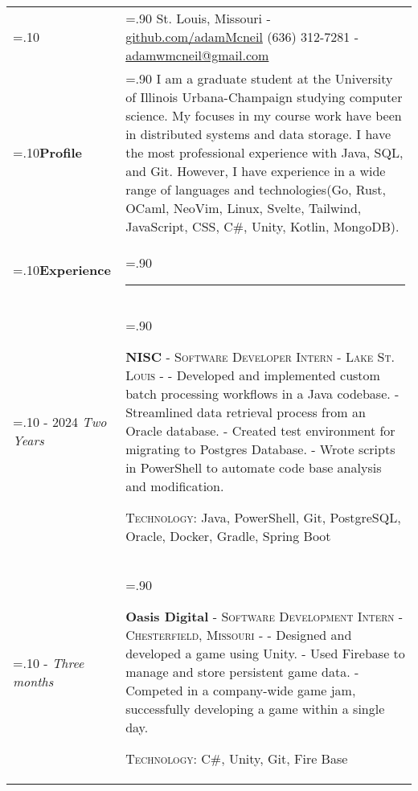 \documentclass[10pt]{article}
\newcommand{\timeFrame}[3] {
  \if\relax\detokenize{#2}\relax
    #1
  \else
    #1 - #2
  \fi
  \newline
  \scriptsize \textit{#3}
}
\newcommand{\entry}[6] {
  \textbf{#1}
  \if\relax\detokenize{#2}\relax
  \else
       - \textsc{#2}
  \fi
  \if\relax\detokenize{#3}\relax
  \else
      - \textsc{#3}
  \fi
  \if\relax\detokenize{#4}\relax
  \else
      - \href{https://#4}{#4}
  \fi
  \newline #5
  \if\relax\detokenize{#6}\relax
  \else
      \newline \textsc{Technology:} #6
  \fi
  \\
}
\newcommand{\horizontalLine}[0] {
    \noindent\rule{.90\linewidth}{0.4pt}
}
\begin{document}

\begin{tabularx}{\linewidth}{>{\hsize=.10\hsize}X>{\hsize=.90\hsize}X}

{\bfseries\large Adam McNeil} &
St. Louis, Missouri - \href{https://github.com/adamMcneil}{github.com/adamMcneil}\newline
{(636) 312-7281 \hspace{5.5mm} - \href{mailto:adamwmcneil@gmail.com}{adamwmcneil@gmail.com}} \\[5pt]

\textbf{Profile} &
{
  I am a graduate student at the University of Illinois Urbana-Champaign studying computer science.
  My focuses in my course work have been in distributed systems and data storage.
  I have the most professional experience with Java, SQL, and Git.
  However, I have experience in a wide range of languages and technologies(Go, Rust, OCaml, NeoVim, Linux, Svelte, Tailwind, JavaScript, CSS, C\#, Unity, Kotlin, MongoDB).
 \newline
} \\

\textbf{Experience} & \horizontalLine \\

\timeFrame{2023}{2024}{Two Years} &
\entry{NISC}
  {Software Developer Intern}
  {Lake St. Louis}
  {}
  {
  - Developed and implemented custom batch processing workflows in a Java codebase. \newline
  - Streamlined data retrieval process from an Oracle database. \newline
  - Created test environment for migrating to Postgres Database. \newline
  - Wrote scripts in PowerShell to automate code base analysis and modification.
  }
  {Java, PowerShell, Git, PostgreSQL, Oracle, Docker, Gradle, Spring Boot \newline}

\timeFrame{2022}{}{Three months} &
\entry{Oasis Digital}
  {Software Development Intern}
  {Chesterfield, Missouri}
  {}
  {
  - Designed and developed a game using Unity. \newline
  - Used Firebase to manage and store persistent game data. \newline
  - Competed in a company-wide game jam, successfully developing a game within a single day.
  }
  {C\#, Unity, Git, Fire Base \newline}



\end{tabularx}
\end{document}

